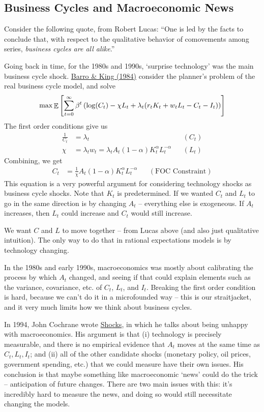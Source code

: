 \documentclass[10pt]{article}
\begin{document}
\subsection{Business Cycles and Macroeconomic News}

Consider the following quote, from Robert Lucas: ``One is led by the facts to conclude that, with respect to the qualitative behavior of comovements among series, \emph{business cycles are all alike}.''

Going back in time, for the 1980s and 1990s, `surprise technology' was the main business cycle shock. \href{https://academic.oup.com/qje/article-abstract/99/4/817/1896484?redirectedFrom=fulltext}{Barro \& King (1984)} consider the planner's problem of the real business cycle model, and solve
\[
\max \mathop{\mathbb{E}}\left[ \sum_{t=0}^\infty \beta^t \left( \log(C_t) - \chi L_t + \lambda_t (r_tK_t + w_tL_t - C_t - I_t)\right) \right]
\]
The first order conditions give us
\begin{align*}
	\frac{1}{C_t} &= \lambda_t &&(C_t) \\
	\chi &= \lambda_t w_t = \lambda_t A_t(1-\alpha)K_t^{\alpha} L_t^{-\alpha} &&(L_t) 
\end{align*}
Combining, we get
\begin{align*}
C_t &= \frac{1}{\chi} A_t (1-\alpha) K_t^\alpha L_t^{-\alpha} &&(\text{FOC Constraint})
\end{align*}
This equation is a very powerful argument for considering technology shocks as business cycle shocks. Note that $K_t$ is predetermined. If we wanted $C_t$ and $L_t$ to go in the same direction is by changing $A_t$ -- everything else is exogeneous. If $A_t$ increases, then $L_t$ could increase and $C_t$ would still increase.

We want $C$ and $L$ to move together -- from Lucas above (and also just qualitative intuition). The only way to do that in rational expectations models is by technology changing.

In the 1980s and early 1990s, macroeconomics was mostly about calibrating the process by which $A_t$ changed, and seeing if that could explain elements such as the variance, covariance, etc. of $C_t$, $L_t$, and $I_t$. Breaking the first order condition is hard, because we can't do it in a microfounded way -- this is our straitjacket, and it very much limits how we think about business cycles.

In 1994, John Cochrane wrote \href{https://www.nber.org/papers/w4698}{Shocks}, in which he talks about being unhappy with macroeconomics. His argument is that (i) technology is precisely measurable, and there is no empirical evidence that $A_t$ moves at the same time as $C_t,L_t,I_t$; and (ii) all of the other candidate shocks (monetary policy, oil prices, government spending, etc.) that we could measure have their own issues. His conclusion is that maybe something like macroeconomic `news' could do the trick -- anticipation of future changes. There are two main issues with this: it's incredibly hard to measure the news, and doing so would still necessitate changing the models.
\end{document}
